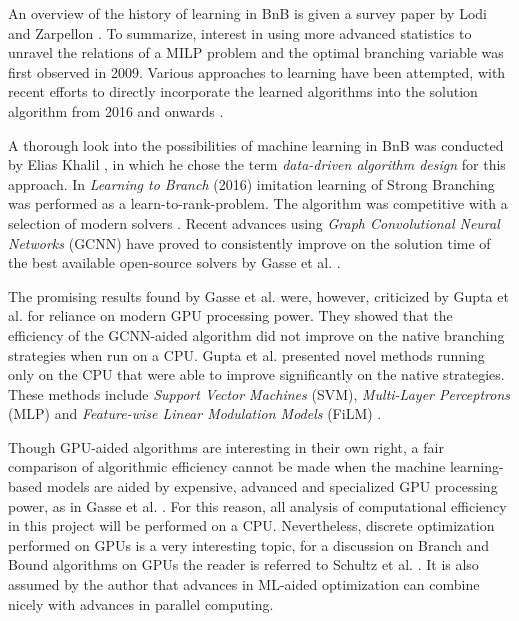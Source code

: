An overview of the history of learning in \gls{BnB} is given a survey paper by Lodi and Zarpellon \cite{lodi2017learning}. To summarize, interest in using more advanced statistics to unravel the relations of a \gls{MILP} problem and the optimal branching variable was first observed in 2009. Various approaches to learning have been attempted, with recent efforts to directly incorporate the learned algorithms into the solution algorithm from 2016 and onwards \cite{lodi2017learning}.  

A thorough look into the possibilities of machine learning in \gls{BnB} was conducted by Elias Khalil \cite{khalil2020towards}, in which he chose the term \textit{data-driven algorithm design} for this approach. 
In \textit{Learning to Branch} (2016) \cite{khalil2016learning} imitation learning of Strong Branching was performed as a learn-to-rank-problem. The algorithm was competitive with a selection of modern solvers \cite{khalil2016learning}. 
Recent advances using\textit{ Graph Convolutional Neural Networks} (\Gls{GCNN}) have proved to consistently improve on the solution time of the best available open-source solvers by Gasse et al.  \cite{gasse2019exact}. 

The promising results found by Gasse et al. \cite{gasse2019exact} were, however, criticized by Gupta et al. \cite{gupta2020hybrid} for reliance on modern \gls{GPU} processing power. They showed that the efficiency of the GCNN-aided algorithm did not improve on the native branching strategies when run on a CPU. Gupta et al. presented novel methods running only on the CPU that were able to improve significantly on the native strategies. These methods include \textit{Support Vector Machines} (\Gls{SVM}), \textit{Multi-Layer Perceptrons} (\Gls{MLP}) and  \textit{Feature-wise Linear Modulation Models} (\gls{FiLM}) \cite{gupta2020hybrid}. 

Though GPU-aided algorithms are interesting in their own right, a fair comparison of algorithmic efficiency cannot be made when the machine learning-based models are aided by expensive, advanced and specialized GPU processing power, as in Gasse et al. \cite{gasse2019exact}. 
For this reason, all analysis of computational efficiency in this project will be performed on a CPU. Nevertheless, discrete optimization performed on GPUs is a very interesting topic, for a discussion on Branch and Bound algorithms on GPUs the reader is referred to Schultz et al. \cite{schulz2013gpu}. It is also assumed by the author that advances in ML-aided optimization can combine nicely with advances in parallel computing.

